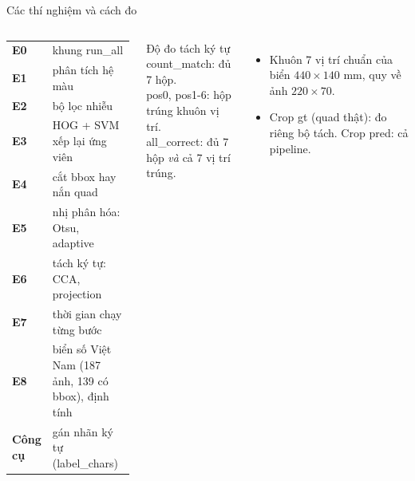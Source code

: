 \documentclass[aspectratio=169,11pt]{beamer}
\newcommand{\code}[1]{{\footnotesize\ttfamily #1}}
\newcommand{\acc}[1]{\textcolor{accent}{\textbf{#1}}}
\begin{document}
\begin{frame}{Các thí nghiệm và cách đo}
  \begin{columns}[T]
    \small
    \begin{tabular}{@{}lp{0.72\linewidth}@{}}
      \acc{E0} & khung \code{run\_all}\\
      \acc{E1} & phân tích hệ màu\\
      \acc{E2} & bộ lọc nhiễu\\
      \acc{E3} & HOG + SVM xếp lại ứng viên\\
      \acc{E4} & cắt bbox hay nắn quad\\
      \acc{E5} & nhị phân hóa: Otsu, adaptive\\
      \acc{E6} & tách ký tự: CCA, projection\\
      \acc{E7} & thời gian chạy từng bước\\
      \acc{E8} & biển số Việt Nam (187 ảnh, 139 có bbox), định tính\\
      \acc{Công cụ} & gán nhãn ký tự (\code{label\_chars})\\
    \end{tabular}
    \begin{block}{Độ đo tách ký tự}
      \small
      \code{count\_match}: đủ 7 hộp.\\
      \code{pos0}, \code{pos1-6}: hộp trúng khuôn vị trí.\\
      \code{all\_correct}: đủ 7 hộp \emph{và} cả 7 vị trí trúng.
    \end{block}
    \begin{itemize}
      \item Khuôn 7 vị trí chuẩn của biển $440\times140$ mm, quy về ảnh $220\times70$.
      \item Crop \code{gt} (quad thật): đo riêng bộ tách. Crop \code{pred}: cả pipeline.
    \end{itemize}
  \end{columns}
\end{frame}
\end{document}
